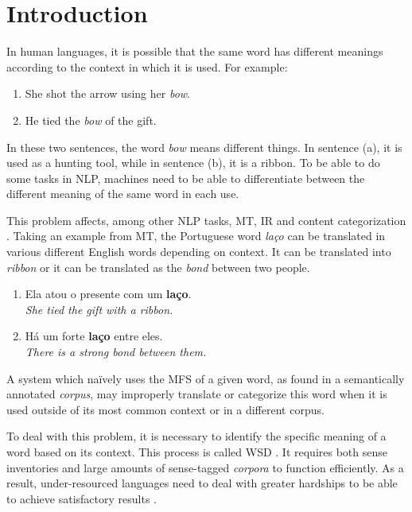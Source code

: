 \chapter{Introduction}


In human languages, it is possible that the same word has different meanings
according to the context in which it is used. For example:

\begin{enumerate}[label=(\alph*)]
 \item She shot the arrow using her \textit{bow}.
 \item He tied the \textit{bow} of the gift.
\end{enumerate}

In these two sentences, the word \textit{bow} means different things. In
sentence (a), it is used as a hunting tool, while in sentence (b), it is a 
ribbon. To be able to do some tasks in \ac{NLP}, machines need to be able to
differentiate between the different meaning of the same word in each use.


This problem affects, among other \ac{NLP} tasks, \ac{MT}, \ac{IR} and content
categorization \citep{navigli2009word}. Taking an example from \ac{MT}, the
Portuguese word \textit{laço} can be translated in various different English
words depending on context. It can be translated into \textit{ribbon} or it can
be translated as the \textit{bond} between two people.

\begin{enumerate}[label=(\alph*)]
	\item Ela atou o presente com um \textbf{laço}. \\ \textit{She tied the 
	gift with a ribbon.}
	\item Há um forte \textbf{laço} entre eles. \\ \textit{There is a strong 
	bond between them.}
\end{enumerate}

A system which naïvely uses the \ac{MFS} of a given word, as found in a 
semantically annotated \emph{corpus}, may improperly translate or categorize 
this word when it is used outside of its most common context or in a different 
corpus.


To deal with this problem, it is necessary to identify the specific meaning of
a word based on its context. This process is called \ac{WSD}
\citep{navigli2009word}. It requires both sense inventories and large amounts 
of sense-tagged \emph{corpora} to function efficiently. As a result, 
under-resourced languages need to deal with greater hardships to be
able to achieve satisfactory results \citep{ng1997getting}.

